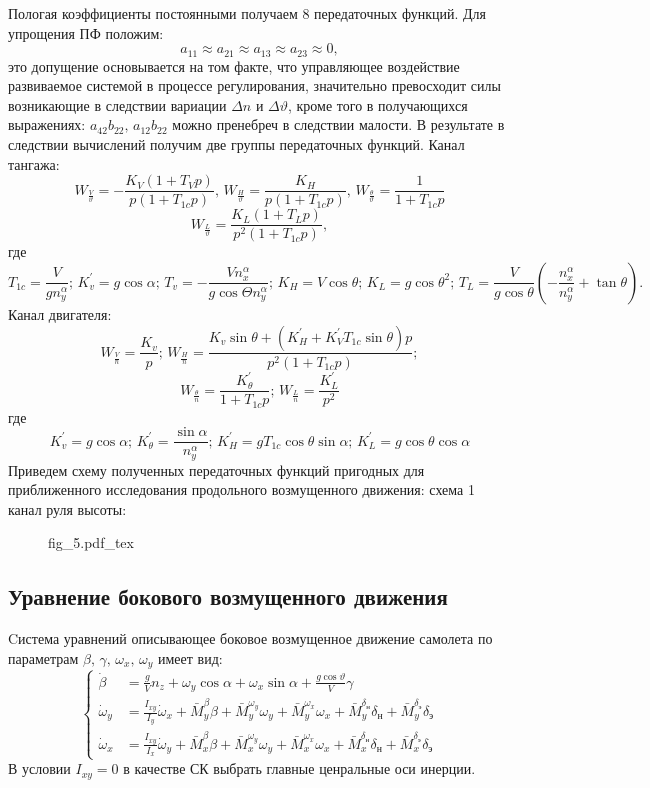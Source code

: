 \documentclass{article}
\begin{document}
Пологая коэффициенты постоянными получаем 8 передаточных функций. Для упрощения ПФ положим:
\[
    a_{11} \approx a_{21} \approx a_{13} \approx a_{23} \approx 0,  
\]
это допущение основывается на том факте, что управляющее воздействие развиваемое системой в процессе регулирования, значительно превосходит силы возникающие в следствии вариации $\Delta n$ и $\Delta \vartheta$, кроме того в получающихся выражениях:
$a_{42} b_{22}, \, a_{12} b_{22}$ можно пренебреч в следствии малости.
В результате в следствии вычислений получим две группы передаточных функций.
Канал тангажа:
\[
	W_{\frac{V}{\vartheta}} = -\frac{K_V(1+T_Vp)}{p(1+T_{1c}p)}, \, W_{\frac{H}{\vartheta}} = \frac{K_H}{p(1+T_{1c}p)}, \, W_{\frac{\theta}{\vartheta}} = \frac{1}{1+T_{1c}p}
\]
\[
	W_{\frac{L}{\vartheta}} = \frac{K_L(1+T_Lp)}{p^2(1+T_{1c}p)},
\]
где
\[
	T_{1c} = \frac{V}{g n_y^\alpha}; \, K_v^{'} = g\cos{\alpha}; \, T_v = -\frac{V n_x^\alpha}{g \cos{\Theta} n_y^\alpha};\, K_H = V \cos{\theta}; \, K_L = g \cos{\theta}^2 ;\, T_L= \frac{V}{g \cos{\theta}} (- \frac{n_x^\alpha}{n_y^\alpha} + \tan{\theta}).
\]
Канал двигателя:
\[
	W_{\frac{V}{n}} = \frac{K_v}{p};\, W_{\frac{H}{n}} = \frac{K_v \sin{\theta} + (K_H^{'} + K_V^{'} T_{1c} \sin{\theta})p}{p^2(1+T_{1c}p)};
\]
\[
	W_{\frac{\theta}{n}} = \frac{K_\theta^{'}}{1+T_{1c}p}; \, W_{\frac{L}{n}} = \frac{K_L^{'}}{p^2} 
\]
где
\[
	K_v^{'} = g\cos{\alpha}; \, K_\theta^{'} = \frac{\sin{\alpha}}{n_y^\alpha}; \, K_H^{'} = gT_{1c} \cos{\theta}\sin{\alpha};\, K_L^{'} = g\cos{\theta} \cos{\alpha}
\]
Приведем схему полученных передаточных функций пригодных для приближенного исследования продольного возмущенного движения:
схема 1 канал руля высоты:
\begin{figure}[ht]
	{fig_5.pdf_tex}
\end{figure}

\subsection{Уравнение бокового возмущенного движения}
Cистема уравнений описывающее боковое возмущенное движение самолета по параметрам $\beta, \, \gamma, \, \omega_x, \, \omega_y$ имеет вид:
\begin{equation}
	\begin{cases}
		\dot{\beta} &= \frac{g}{V} n_z + \omega_y \cos{\alpha} + \omega_x \sin{\alpha} + \frac{g\cos{\vartheta}}{V} \gamma                                                                                              \\
        \dot{\omega}_y&= \frac{I_{xy}}{I_y} \dot{\omega}_x + \bar{M}_y^\beta \beta + \bar{M}_y^{\omega_y} \omega_y + \bar{M}_y^{\omega_x} \omega_x + \bar{M}_y^{\delta_\text{н}} \delta_\text{н} + \bar{M}_y^{\delta_\text{э}} \delta_\text{э} \\
        \dot{\omega}_x&= \frac{I_{xy}}{I_x} \dot{\omega}_y + \bar{M}_x^\beta \beta + \bar{M}_x^{\omega_y} \omega_y + \bar{M}_x^{\omega_x} \omega_x + \bar{M}_x^{\delta_\text{н}} \delta_\text{н} + \bar{M}_x^{\delta_\text{э}} \delta_\text{э} 
	\end{cases}
\end{equation}
В условии $I_{xy} = 0$ в качестве СК выбрать главные ценральные оси инерции.
\end{document}
